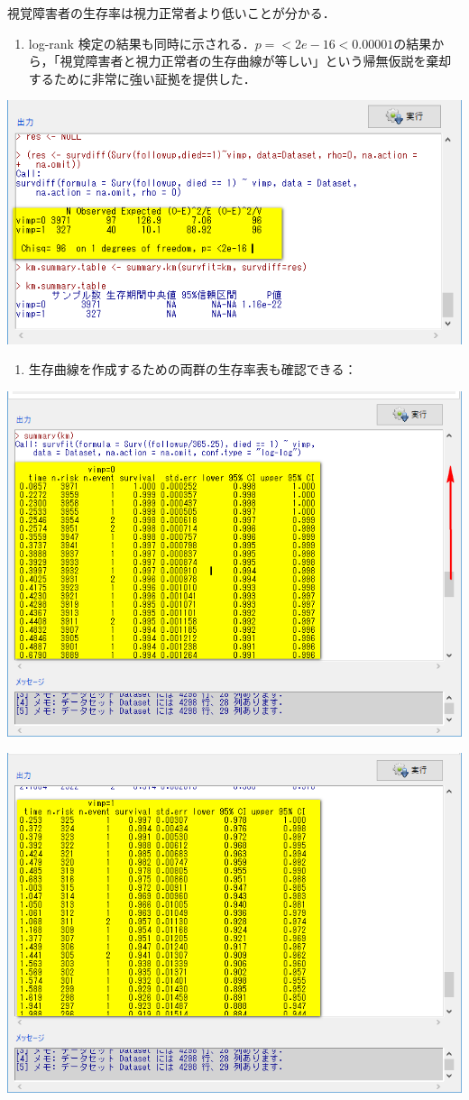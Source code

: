 \documentclass[11pt,]{problemset}
\providecommand{\tightlist}{%
  \setlength{\itemsep}{0pt}\setlength{\parskip}{0pt}}
\begin{document}
視覚障害者の生存率は視力正常者より低いことが分かる．

\begin{enumerate}
\def\labelenumi{\arabic{enumi}.}
\setcounter{enumi}{3}
\tightlist
\item
  log-rank
  検定の結果も同時に示される．\(p = <2e-16 < 0.00001\)の結果から，「視覚障害者と視力正常者の生存曲線が等しい」という帰無仮説を棄却するために非常に強い証拠を提供した．
\end{enumerate}

\begin{center}\includegraphics[width=0.6\linewidth,height=0.4\textheight]{pic/survival10} \end{center}

\begin{enumerate}
\def\labelenumi{\arabic{enumi}.}
\setcounter{enumi}{4}
\tightlist
\item
  生存曲線を作成するための両群の生存率表も確認できる：
\end{enumerate}

\begin{center}\includegraphics[width=0.6\linewidth,height=0.4\textheight]{pic/survival11} \end{center}

\begin{center}\includegraphics[width=0.6\linewidth,height=0.4\textheight]{pic/survival12} \end{center}
\end{document}
